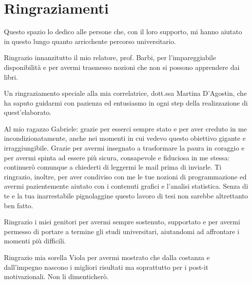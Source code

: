 \setcounter{secnumdepth}{-1}
\chapter{Ringraziamenti}

Questo spazio lo dedico alle persone che, con il loro supporto, mi hanno aiutato in questo lungo quanto arricchente percorso universitario. 

\bigskip \noindent
Ringrazio innanzitutto il mio relatore, prof. Barbi, per l'impareggiabile disponibilità e per avermi trasmesso nozioni che non si possono apprendere dai libri.

\bigskip \noindent
Un ringraziamento speciale alla mia correlatrice, dott.ssa Martina D'Agostin, che ha saputo guidarmi con pazienza ed entusiasmo in ogni step della realizzazione di quest'elaborato. %

\bigskip \noindent
Al mio ragazzo Gabriele: grazie per esserci sempre stato e per aver creduto in me incondizionatamente, anche nei momenti in cui vedevo questo obiettivo gigante e irraggiungibile. Grazie per avermi insegnato a trasformare la paura in coraggio e per avermi spinta ad essere più sicura, consapevole e fiduciosa in me stessa: continuerò comunque a chiederti di leggermi le mail prima di inviarle. Ti ringrazio, inoltre, per aver condiviso con me le tue nozioni di programmazione ed avermi pazientemente aiutato con i contenuti grafici e l'analisi statistica. Senza di te e la tua inarrestabile pignolaggine questo lavoro di tesi non sarebbe altrettanto ben fatto.


\bigskip \noindent
Ringrazio i miei genitori per avermi sempre sostenuto, supportato e per avermi permesso di portare a termine gli studi universitari, aiutandomi ad affrontare i momenti più difficili. 

\bigskip \noindent
Ringrazio mia sorella Viola per avermi mostrato che dalla costanza e dall'impegno nascono i migliori risultati ma soprattutto per i post-it motivazionali. Non li dimenticherò. 

